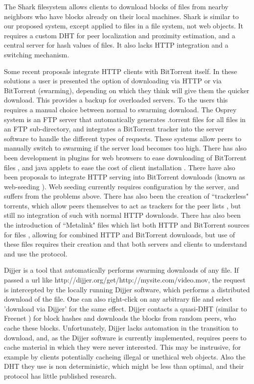The Shark \cite{shark} filesystem allows clients to download blocks of files from nearby neighbors who have blocks already on their local machines.  
Shark is similar to our proposed system, except applied to files in a file system, not web objects.  It  requires a custom DHT for peer localization and proximity estimation, 
and a central server for hash values of files.  It also lacks HTTP integration and a switching mechanism.

Some recent proposals integrate HTTP clients with BitTorrent itself.  In these solutions a user is presented the option of downloading via HTTP or via BitTorrent (swarming), 
depending on which they think will give them the quicker download.  This provides a backup for overloaded servers.  To the users this requires a manual choice between normal to 
swarming download.  
The Osprey system \cite{osprey} is an FTP server that automatically generates .torrent files for all files in an FTP sub-directory, 
and integrates a BitTorrent tracker into the server software to handle the different types of requests.  
These systems allow peers to manually switch to swarming if the server load becomes too high.  
There has also been development in plugins for web browsers to ease downloading of BitTorrent files \cite{opera, foxtorrent}, and java applets to ease the cost of client installation \cite{bitlet}.
There have also been proposals to integrate HTTP serving into BitTorrent downloads (known as web-seeding \cite{bittorrent_wikipedia}).  Web seeding currently requires configuration by the server, 
and suffers from the problems above.  There has also been the creation of ``trackerless" torrents, which allow peers themselves to act as trackers for the peer lists \cite{bittorrent_wikipedia}, but still no integration of such
with normal HTTP downloads.  There has also been the introduction of ``Metalink" files which list both HTTP and BitTorrent sources for files \cite{metalink_wikipedia}, 
allowing for combined HTTP and BitTorrent downloads, but use of these files requires their creation and that both servers and clients to understand and use the protocol.

Dijjer \cite{dijjer} is a tool that automatically performs swarming downloads of any file.  
If passed a url like http://dijjer.org/get/http://mysite.com/video.mov, the request is intercepted by the locally running Dijjer software, 
which performs a distributed download of the file.  One can also right-click on any arbitrary file and select 'download via Dijjer' for the same effect.  Dijjer contacts a quasi-DHT (similar to Freenet \cite{freenet}) for block hashes and downloads the blocks from random peers, 
who cache these blocks.  Unfortunately, Dijjer lacks automation in the transition to download, and, as the Dijjer software is currently implemented, requires peers to cache material in which they were never interested.
  This may be instrusive, for example by clients potentially cacheing illegal or unethical web objects.  Also the DHT they use is non deterministic, which might be less than optimal,
  and their protocol has little published research.

